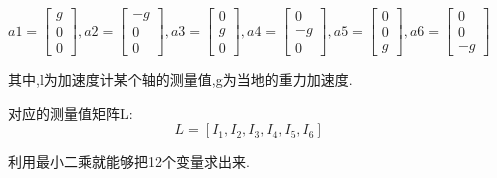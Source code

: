 \begin{frame}
\begin{columns}
\begin{enumerate}
    \begin{equation}
      a1 = \begin{bmatrix}
        g \\ 0 \\ 0
      \end{bmatrix},
      a2 = \begin{bmatrix}
        -g \\ 0 \\ 0
      \end{bmatrix},
      a3 = \begin{bmatrix}
        0 \\ g \\ 0
      \end{bmatrix},
      a4 = \begin{bmatrix}
        0 \\ -g \\ 0
      \end{bmatrix},
      a5 = \begin{bmatrix}
        0 \\ 0 \\ g
      \end{bmatrix},
      a6 = \begin{bmatrix}
        0 \\ 0 \\ -g
      \end{bmatrix}
    \end{equation}

    其中,l为加速度计某个轴的测量值,g为当地的重力加速度.

    对应的测量值矩阵L:
    \begin{equation}
      L = [I_1, I_2,I_3,I_4,I_5, I_6]  
    \end{equation}

    利用最小二乘就能够把12个变量求出来.

  \end{enumerate}
  
  

\end{columns}
\end{frame} 




